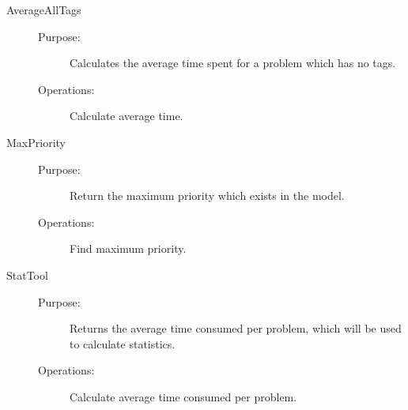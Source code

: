 \begin{description}
\item[AverageAllTags]\hfill
\begin{description}
\item[Purpose:]Calculates the average time spent for a problem which has no tags.
\item[Operations:]Calculate average time.
\end{description}
\end{description}

\begin{description}
\item[MaxPriority]\hfill
\begin{description}
\item[Purpose:] Return the maximum priority which exists in the model.
\item[Operations:]Find maximum priority.
\end{description}
\end{description}

\begin{description}
\item[StatTool]\hfill
\begin{description}
\item[Purpose:] Returns the average time consumed per problem, which will be used to calculate statistics.
\item[Operations:]Calculate average time consumed per problem.
\end{description}
\end{description}